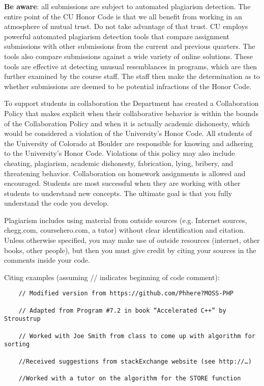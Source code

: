 \textbf{Be aware}: all submissions are subject to automated plagiarism detection. The entire point of the CU Honor Code is that we all benefit from working in an atmosphere of mutual trust. Do not take advantage of that trust. CU employs powerful automated plagiarism detection tools that compare assignment submissions with other submissions from the current and previous quarters. The tools also compare submissions against a wide variety of online solutions. These tools are effective at detecting unusual resemblances in programs, which are then further examined by the course staff. The staff then make the determination as to whether submissions are deemed to be potential infractions of the Honor Code.

To support students in collaboration the Department has created a Collaboration Policy that makes explicit when their collaborative behavior is within the bounds of the Collaboration Policy and when it is actually academic dishonesty, which would be considered a violation of the University’s Honor Code. All students of the University of Colorado at Boulder are responsible for knowing and adhering to the University’s Honor Code. Violations of this policy may also include cheating, plagiarism, academic dishonesty, fabrication, lying, bribery, and threatening behavior. Collaboration on homework assignments is allowed and encouraged. Students are most successful when they are working with other students to understand new concepts. The ultimate goal is that you fully understand the code you develop. 

Plagiarism includes using material from outside sources (e.g. Internet sources, chegg.com, coursehero.com, a tutor) without clear identification and citation. Unless otherwise specified, you may make use of outside resources (internet, other books, other people), but then you must give credit by citing your sources in the comments inside your code.

Citing examples (assuming // indicates beginning of code comment):

\begin{verbatim}
    // Modified version from https://github.com/Phhere?MOSS-PHP
    
    // Adapted from Program #7.2 in book “Accelerated C++” by Stroustrup
    
    // Worked with Joe Smith from class to come up with algorithm for sorting
    
    //Received suggestions from stackExchange website (see http://…)
    
    //Worked with a tutor on the algorithm for the STORE function
\end{verbatim}


